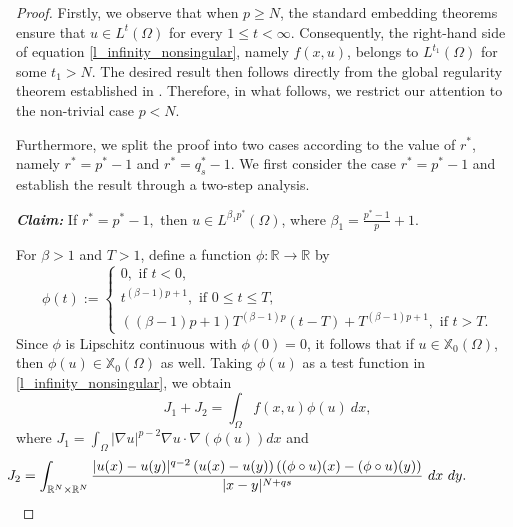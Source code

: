 \documentclass[reqno,oneside]{amsart}
\theoremstyle{definition}
\theoremstyle{remark}
\numberwithin{equation}{section}
\newcommand{\Om} {\Omega}
\newcommand{\sr}{\mathbb{R}}
\newcommand{\ba}{\beta}
\newcommand{\rar}{\rightarrow}
\newcommand{\na} {\nabla}
\newcommand{\xo}{\mathbb{X}_0}
\begin{document}
\begin{proof}
    Firstly, we observe that when $p\geq N$, the standard embedding theorems ensure that $u\in L^t(\Om)$ for every $1\leq t < \infty$. Consequently, the right-hand side of equation \eqref{l_infinity_nonsingular}, namely $f(x,u)$, belongs to $L^{t_1}(\Om)$ for some $t_1 > N$. The desired result then follows directly from the global regularity theorem established in \cite{antonini2023global}. Therefore, in what follows, we restrict our attention to the non-trivial case $p<N$.
    
    Furthermore, we split the proof into two cases according to the value of $r^*$, namely $r^* = p^* -1$ and $r^* = q_s^* -1$. We first consider the case $r^* = p^* -1$ and establish the result through a two-step analysis.
    \vspace{5pt}

    \noindent\textit{\textbf{Claim:}} If $r^*=p^*-1,$ then $u\in L^{\beta_1 p^*}(\Om)$, where $\beta_1 = \frac{p^* -1}{p}+1$.
    \vspace{5pt}
    
    For $\beta>1$ and $T>1$, define a function $\phi: \sr\rar\sr$ by
    \[\phi(t) := \begin{cases}
        0, \text{ if } t < 0,\\[1mm]
        t^{(\ba -1)p+1}, \text{ if } 0 \leq t \leq T,\\[1mm]
        \left( (\ba-1)p+1 \right) T^{(\ba -1)p} \left(t-T \right) +T^{(\ba-1)p+1}, \text{ if } t > T.
    \end{cases}\]
    Since $\phi$ is Lipschitz continuous with $\phi(0)=0$, it follows that if $u\in\xo (\Om)$, then $\phi(u)\in\xo (\Om)$ as well. Taking $\phi(u)$ as a test function in \eqref{l_infinity_nonsingular}, we obtain
    \begin{equation}\label{I1 and I2 equation}
        J_1 + J_2 = \int_{\Om} f(x,u) \phi(u)\ dx,
    \end{equation}
    where $\displaystyle J_1 = \int_{\Om} |\na u|^{p-2} \na u \cdot \na \left(\phi(u)\right) dx$ and \[\hspace{-45pt}J_2 = \int_{\sr^N \times \sr^N} \frac{|u(x)-u(y)|^{q-2} \left( u(x)-u(y) \right) \left((\phi \circ u)(x) - (\phi \circ u)(y) \right)}{|x-y|^{N+qs}}\ dx\ dy.\]


\end{proof}
\end{document}
